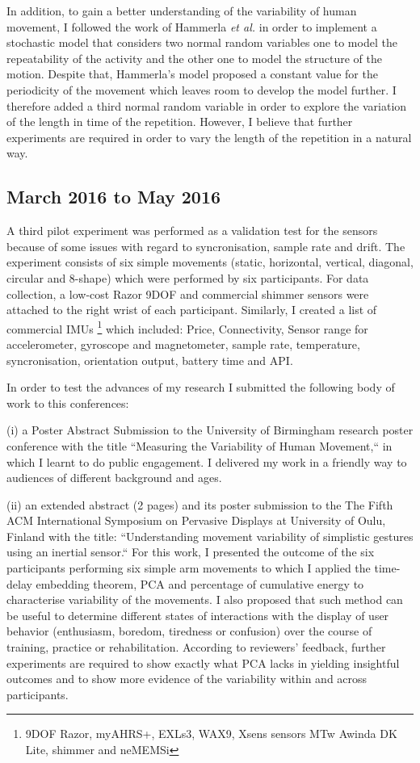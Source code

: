 \documentclass[9pt,journal,onecolumn,compsoc]{IEEEtran}
\begin{document}
In addition, to gain a better understanding of the variability of human movement,
I followed the work of Hammerla  \textit{et al.} \cite{Hammerla2011} in order to implement a stochastic model 
that considers two normal random variables one to model the repeatability of the activity 
and the other one to model the structure of the motion.
Despite that,
Hammerla's model proposed a constant value for the periodicity of the movement 
which leaves room to develop the model further.
I therefore added a third normal random variable 
in order to explore the variation of the length in time of the repetition.
However, I believe that further experiments 
are required in order to vary the length of the repetition in a natural way.




\subsection{March 2016 to May 2016}

A third pilot experiment was performed as a validation test
for the sensors because of some issues with regard to syncronisation, sample rate and drift.
The experiment consists of six simple movements 
(static, horizontal, vertical, diagonal, circular and 8-shape)
which were performed by six participants. 
For data collection, a low-cost Razor 9DOF and commercial shimmer sensors were attached to the right wrist of each participant.
Similarly, I created a list of commercial IMUs
\footnote{9DOF Razor, myAHRS+, EXLs3, WAX9, Xsens sensors MTw Awinda DK Lite, shimmer and neMEMSi}
which included:
Price, Connectivity, Sensor range for accelerometer, gyroscope and magnetometer, 
sample rate, temperature, syncronisation, orientation output, battery time and API.

In order to test the advances of my research
I submitted the following body of work to this conferences:

(i) a Poster Abstract Submission to the University of Birmingham research poster conference
with the title ``Measuring the Variability of Human Movement,``
in which I learnt to do public engagement. I delivered my work in a friendly way to audiences of 
different background and ages.

(ii) an extended abstract (2 pages) and its poster submission to the The Fifth ACM International 
Symposium on Pervasive Displays at University of Oulu, Finland with the title: 
``Understanding movement variability of simplistic gestures using an inertial sensor.``
For this work, I presented the outcome of the six participants performing six simple arm movements
to which I applied the time-delay embedding theorem, PCA and percentage of cumulative energy 
to characterise variability of the movements. 
I also proposed that such method can be useful
to determine different states of interactions with the display of user behavior 
(enthusiasm, boredom, tiredness or confusion) over the course of training, practice or rehabilitation.
According to reviewers' feedback, 
further experiments are required to show exactly what PCA lacks in yielding insightful outcomes
and to show more evidence of the variability within and across participants.
\end{document}
